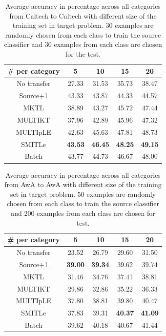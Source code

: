 \begin{table}[h]
  \centering
  \caption{Average accuracy in percentage across all categories from Caltech to Caltech with different size of the training set in target problem. 30 examples are randomly chosen from each class to train the source classifier and 30 examples from each class are chosen for the test. }
    \begin{tabular}{|c|c|c|c|c|}
    \hline
      \# per category    & 5     & 10    & 15    & 20 \\
    \hline
    No transfer &         27.33  &         31.53  &         35.73  &         38.47  \\
    Source+1    &         43.33  &         43.87   &         44.33  &         44.57   \\
    MKTL        &         38.89  &         43.27   &         45.72  &         47.44   \\
    MULTIKT     &         37.96  &         42.89   &         45.96  &         47.32  \\
    MULTIpLE    &         42.63  &         45.63   &         47.81  &         48.73 \\
    SMITLe        &         \textbf{43.53 }&         \textbf{46.45 } &         \textbf{48.25 } &         \textbf{49.15 } \\
        \hline
    Batch       &         43.77  &         44.73   &         46.67  &         48.00 \\
    \hline
    \end{tabular}%
  \label{tab:C2C}%
\end{table}%

\begin{table}[h]
  \centering
  \caption{Average accuracy in percentage across all categories from AwA to AwA with different size of the training set in target problem. 50 examples are randomly chosen from each class to train the source classifier and 200 examples from each class are chosen for test.}
    \begin{tabular}{|c|c|c|c|c|}
    \hline
     \# per category    & 5     & 10    & 15    & 20 \\
    \hline
    No transfer &         23.52  &         26.79  &         29.60  &         31.50  \\
    Source+1    &         \textbf{ 39.00 } &         \textbf{ 39.34 } &         39.62 &         39.74  \\
    MKTL        &         31.46  &         34.76  &         37.41  &         38.81  \\
    MULTIKT     &         29.86  &         32.86  &         35.22  &         36.33  \\
    MULTIpLE    &         37.80  &         38.81  &         39.80  &         40.47  \\
    SMITLe        &        37.83  &         { 39.31 } &         \textbf{ 40.37 } &         \textbf{41.09} \\
        \hline
    Batch       &         39.62  &         40.18  &         40.67  &         41.44  \\
    \hline
    \end{tabular}%
  \label{tab:A2A}%
\end{table}%


